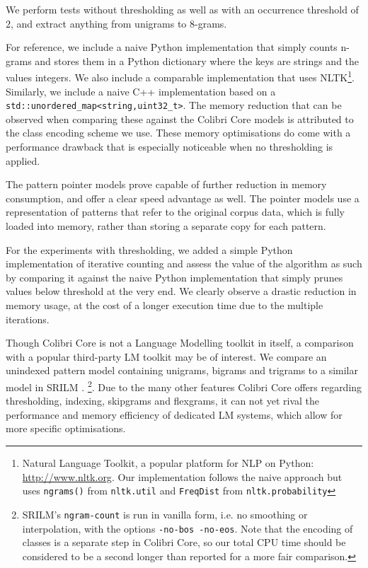 We perform tests without thresholding as well as with an occurrence threshold
of $2$, and extract anything from unigrams to $8$-grams.

For reference, we include a naive Python implementation that simply counts
n-grams and stores them in a Python dictionary where the keys are strings and
the values integers. We also include a comparable implementation that uses
NLTK\footnote{Natural Language Toolkit, a popular platform for NLP on Python:
    \url{http://www.nltk.org}. Our implementation follows the naive approach
    but uses \texttt{ngrams()} from \texttt{nltk.util} and \texttt{FreqDist} from
\texttt{nltk.probability}}. Similarly, we include a naive C++ implementation based on
a \texttt{std::unordered\_map<string,uint32\_t>}. The memory reduction that can be
observed when comparing these against the Colibri Core models is attributed to
the class encoding scheme we use. These memory optimisations do come with a
performance drawback that is especially noticeable when no thresholding is
applied.

The pattern pointer models prove capable of further reduction in memory
consumption, and offer a clear speed advantage as well. The pointer models use a
representation of patterns that refer to the original corpus data, which is
fully loaded into memory, rather than storing a separate copy for each pattern.

For the experiments with thresholding, we added a simple Python implementation of
iterative counting and assess the value of the algorithm as such by comparing
it against the naive Python implementation that simply prunes values below
threshold at the very end. We clearly observe a drastic reduction in memory
usage, at the cost of a longer execution time due to the multiple iterations.

Though Colibri Core is not a Language Modelling toolkit in itself, a comparison
with a popular third-party LM toolkit may be of interest. We compare an
unindexed pattern model containing unigrams, bigrams and trigrams to a similar
model in SRILM \cite{SRILM}. \footnote{SRILM's \texttt{ngram-count} is run in
vanilla form, i.e. no smoothing or interpolation, with the options
\texttt{-no-bos -no-eos}. Note that the encoding of classes is a separate step in
Colibri Core, so our total CPU time should be considered to be a second longer
than reported for a more fair comparison.}. Due to the many other features
Colibri Core offers regarding thresholding, indexing, skipgrams and flexgrams, it
can not yet rival the performance and memory efficiency of dedicated LM systems,
which allow for more specific optimisations.

